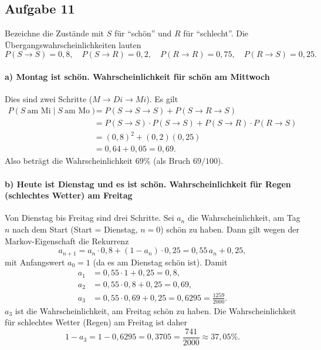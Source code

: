 \documentclass[11pt,a4paper,oneside]{article}
\begin{document}
	\newpage
	
	\begin{loesung}{}
		\subsection*{Aufgabe 11}
		Bezeichne die Zustände mit \(S\) für ``schön'' und \(R\) für ``schlecht''. Die Übergangswahrscheinlichkeiten lauten
		\[
		P(S\to S)=0{,}8,\quad P(S\to R)=0{,}2,\quad P(R\to R)=0{,}75,\quad P(R\to S)=0{,}25.
		\]
		
		\paragraph{a) Montag ist schön. Wahrscheinlichkeit für schön am Mittwoch}
		Dies sind zwei Schritte (\(M\to Di\to Mi\)). Es gilt
		\[
		\begin{aligned}
			P(S\ \text{am Mi}\mid S\ \text{am Mo})
			&=P(S\to S\to S)+P(S\to R\to S)\\
			&=P(S\to S)\cdot P(S\to S)+P(S\to R)\cdot P(R\to S)\\
			&=(0{,}8)^2 + (0{,}2)(0{,}25)\\
			&=0{,}64+0{,}05=0{,}69.
		\end{aligned}
		\]
		Also beträgt die Wahrscheinlichkeit \(69\%\) (als Bruch \(69/100\)).
		
		\paragraph{b) Heute ist Dienstag und es ist schön. Wahrscheinlichkeit für Regen (schlechtes Wetter) am Freitag}
		Von Dienstag bis Freitag sind drei Schritte. Sei \(a_n\) die Wahrscheinlichkeit, am Tag \(n\) nach dem Start (Start = Dienstag, \(n=0\)) schön zu haben. Dann gilt wegen der Markov-Eigenschaft die Rekurrenz
		\[
		a_{n+1}=a_n\cdot 0{,}8 + (1-a_n)\cdot 0{,}25 = 0{,}55\,a_n + 0{,}25,
		\]
		mit Anfangswert \(a_0=1\) (da es am Dienstag schön ist). Damit
		\[
		\begin{aligned}
			a_1 &= 0{,}55\cdot 1 + 0{,}25 = 0{,}8,\\
			a_2 &= 0{,}55\cdot 0{,}8 + 0{,}25 = 0{,}69,\\
			a_3 &= 0{,}55\cdot 0{,}69 + 0{,}25 = 0{,}6295 = \frac{1259}{2000}.
		\end{aligned}
		\]
		\(a_3\) ist die Wahrscheinlichkeit, am Freitag schön zu haben. Die Wahrscheinlichkeit für schlechtes Wetter (Regen) am Freitag ist daher
		\[
		1-a_3 = 1-0{,}6295 = 0{,}3705 = \frac{741}{2000}\approx 37{,}05\%.
		\]
	\end{loesung}
	
\end{document}
